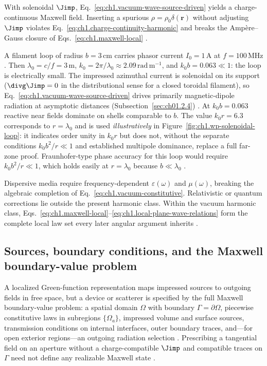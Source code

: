 With solenoidal \(\Jimp\), Eq.~\eqref{eq:ch1.vacuum-wave-source-driven} yields a charge-continuous Maxwell field. Inserting a spurious \(\rho=\rho_0\delta(\mathbf{r})\) without adjusting \(\Jimp\) violates Eq.~\eqref{eq:ch1.charge-continuity-harmonic} and breaks the Amp\`ere--Gauss closure of Eqs.~\eqref{eq:ch1.maxwell-local} \cite{maxwell1873,stratton1941}.

\begin{example}
\label{ex:ch1.filament-loop}
A filament loop of radius \(b=3\,\mathrm{cm}\) carries phasor current \(I_0=1\,\mathrm{A}\) at \(f=100\,\mathrm{MHz}\). Then \(\lambda_0=c/f=3\,\mathrm{m}\), \(k_0=2\pi/\lambda_0\approx2.09\,\mathrm{rad\,m^{-1}}\), and \(k_0 b=0.063\ll1\): the loop is electrically small. The impressed azimuthal current is solenoidal on its support (\(\divg\Jimp=0\) in the distributional sense for a closed toroidal filament), so Eq.~\eqref{eq:ch1.vacuum-wave-source-driven} drives primarily magnetic-dipole radiation at asymptotic distances (Subsection~\ref{sec:ch01.2.4}) \cite{stratton1941,harrington2001}. At \(k_0 b=0.063\) reactive near fields dominate on shells comparable to \(b\). The value \(k_0 r=6.3\) corresponds to \(r=\lambda_0\) and is used \emph{illustratively} in Figure~\ref{fig:ch1.wp-solenoidal-loop}: it indicates order unity in \(k_0 r\) but does not, without the separate conditions \(k_0 b^2/r\ll1\) and established multipole dominance, replace a full far-zone proof. Fraunhofer-type phase accuracy for this loop would require \(k_0 b^2/r\ll1\), which holds easily at \(r=\lambda_0\) because \(b\ll\lambda_0\) \cite{stratton1941,jackson1999}.
\end{example}

Dispersive media require
frequency-dependent \(\varepsilon(\omega)\) and \(\mu(\omega)\), breaking the
algebraic completion of Eq.~\eqref{eq:ch1.vacuum-constitutive}. Relativistic or
quantum corrections lie outside the present harmonic class. Within the vacuum harmonic class,
Eqs.~\eqref{eq:ch1.maxwell-local}--\eqref{eq:ch1.local-plane-wave-relations}
form the complete local law set every later angular argument inherits
\cite{maxwell1873}.

\subsection{Sources, boundary conditions, and the Maxwell boundary-value problem}
\label{sec:ch01.1.2}

A localized Green-function representation maps impressed sources to outgoing fields in free space, but a device or scatterer is specified by the full Maxwell boundary-value problem: a spatial domain $\Omega$ with boundary $\Gamma=\partial\Omega$, piecewise constitutive laws in subregions $\{\Omega_a\}$, impressed volume and surface sources, transmission conditions on internal interfaces, outer boundary traces, and---for open exterior regions---an outgoing radiation selection \cite{stratton1941,maxwell1873}. Prescribing a tangential field on an aperture without a charge-compatible $\Jimp$ and compatible traces on $\Gamma$ need not define any realizable Maxwell state \cite{harrington2001,chu1948}.

